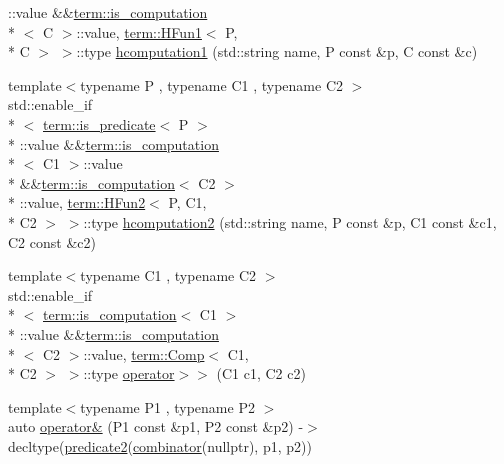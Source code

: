\begin{DoxyCompactItemize}
\-::value \&\&\hyperlink{structpfq__lang_1_1term_1_1is__computation}{term\-::is\-\_\-computation}\\*
$<$ C $>$\-::value, \hyperlink{structpfq__lang_1_1term_1_1HFun1}{term\-::\-H\-Fun1}$<$ P, \\*
C $>$ $>$\-::type \hyperlink{namespacepfq__lang_a778ddb4e54e9a8f8c31af25ab08fa131}{hcomputation1} (std\-::string name, P const \&p, C const \&c)
\item 
{\footnotesize template$<$typename P , typename C1 , typename C2 $>$ }\\std\-::enable\-\_\-if\\*
$<$ \hyperlink{structpfq__lang_1_1term_1_1is__predicate}{term\-::is\-\_\-predicate}$<$ P $>$\\*
\-::value \&\&\hyperlink{structpfq__lang_1_1term_1_1is__computation}{term\-::is\-\_\-computation}\\*
$<$ C1 $>$\-::value \\*
\&\&\hyperlink{structpfq__lang_1_1term_1_1is__computation}{term\-::is\-\_\-computation}$<$ C2 $>$\\*
\-::value, \hyperlink{structpfq__lang_1_1term_1_1HFun2}{term\-::\-H\-Fun2}$<$ P, C1, \\*
C2 $>$ $>$\-::type \hyperlink{namespacepfq__lang_a0f3e7007ec3c6cbec92fda3f6e0de6bf}{hcomputation2} (std\-::string name, P const \&p, C1 const \&c1, C2 const \&c2)
\item 
{\footnotesize template$<$typename C1 , typename C2 $>$ }\\std\-::enable\-\_\-if\\*
$<$ \hyperlink{structpfq__lang_1_1term_1_1is__computation}{term\-::is\-\_\-computation}$<$ C1 $>$\\*
\-::value \&\&\hyperlink{structpfq__lang_1_1term_1_1is__computation}{term\-::is\-\_\-computation}\\*
$<$ C2 $>$\-::value, \hyperlink{structpfq__lang_1_1term_1_1Comp}{term\-::\-Comp}$<$ C1, \\*
C2 $>$ $>$\-::type \hyperlink{namespacepfq__lang_a906ef152d395b1870a16c204571684cb}{operator$>$$>$} (C1 c1, C2 c2)
\item 
{\footnotesize template$<$typename P1 , typename P2 $>$ }\\auto \hyperlink{namespacepfq__lang_aa6f7aa80466e4cfd61a341fcf7a2eda4}{operator\&} (P1 const \&p1, P2 const \&p2) -\/$>$ decltype(\hyperlink{namespacepfq__lang_a89ea436faf8b7f13512e07efbce83b41}{predicate2}(\hyperlink{namespacepfq__lang_a35f3de0a6684c64d0465aa3f263fa8a6}{combinator}(nullptr), p1, p2))

\end{DoxyCompactItemize}

